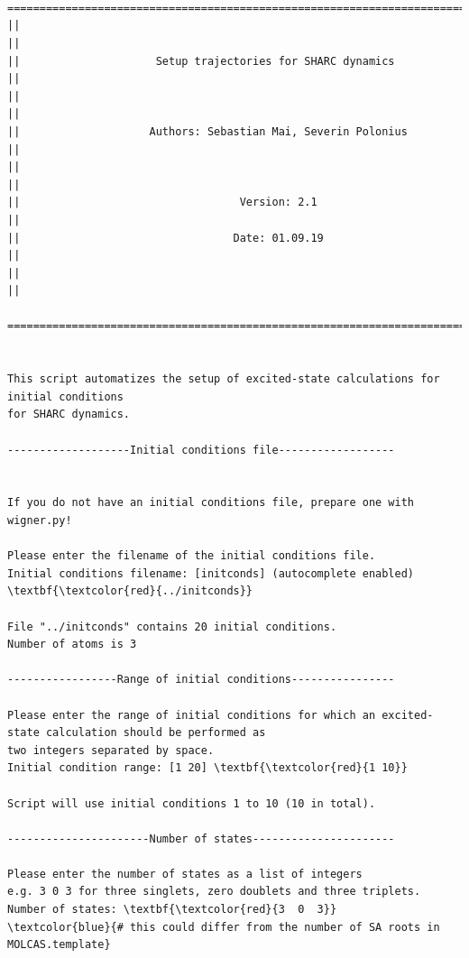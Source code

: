 \documentclass[a4paper,11pt,DIV=15,openany]{scrbook}
\begin{document}
\begin{oframed}
\footnotesize\begin{Verbatim}[commandchars=\\\{\}]


  ================================================================================
||                                                                                ||
||                     Setup trajectories for SHARC dynamics                      ||
||                                                                                ||
||                    Authors: Sebastian Mai, Severin Polonius                    ||
||                                                                                ||
||                                  Version: 2.1                                  ||
||                                 Date: 01.09.19                                 ||
||                                                                                ||
  ================================================================================


This script automatizes the setup of excited-state calculations for initial conditions
for SHARC dynamics.
  
-------------------Initial conditions file------------------


If you do not have an initial conditions file, prepare one with wigner.py!

Please enter the filename of the initial conditions file.
Initial conditions filename: [initconds] (autocomplete enabled) \textbf{\textcolor{red}{../initconds}}

File "../initconds" contains 20 initial conditions.
Number of atoms is 3

-----------------Range of initial conditions----------------

Please enter the range of initial conditions for which an excited-state calculation should be performed as 
two integers separated by space.
Initial condition range: [1 20] \textbf{\textcolor{red}{1 10}}

Script will use initial conditions 1 to 10 (10 in total).

----------------------Number of states----------------------

Please enter the number of states as a list of integers
e.g. 3 0 3 for three singlets, zero doublets and three triplets.
Number of states: \textbf{\textcolor{red}{3  0  3}}     \textcolor{blue}{# this could differ from the number of SA roots in MOLCAS.template}


\end{Verbatim}
\end{oframed}
\end{document}
